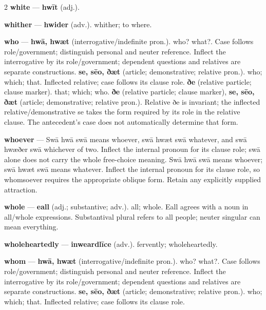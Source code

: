 \begin{multicols}{2}
\textbf{white} — \textbf{hwīt} (adj.).\par
\textbf{whither} — \textbf{hwider} (adv.). whither; to where.\par
\textbf{who} — \textbf{hwā, hwæt} (interrogative/indefinite pron.). who? what?. Case follows role/government; distinguish personal and neuter reference. Inflect the interrogative by its role/government; dependent questions and relatives are separate constructions. \textbf{se, sēo, ðæt} (article; demonstrative; relative pron.). who; which; that. Inflected relative; case follows its clause role. \textbf{ðe} (relative particle; clause marker). that; which; who. \textbf{ðe} (relative particle; clause marker), \textbf{se, sēo, ðæt} (article; demonstrative; relative pron.). Relative ðe is invariant; the inflected relative/demonstrative se takes the form required by its role in the relative clause. The antecedent’s case does not automatically determine that form.\par
\textbf{whoever} — Swā hwā swā means whoever, swā hwæt swā whatever, and swā hwæðer swā whichever of two. Inflect the internal pronoun for its clause role; swā alone does not carry the whole free-choice meaning. Swā hwā swā means whoever; swā hwæt swā means whatever. Inflect the internal pronoun for its clause role, so whomsoever requires the appropriate oblique form. Retain any explicitly supplied attraction.\par
\textbf{whole} — \textbf{eall} (adj.; substantive; adv.). all; whole. Eall agrees with a noun in all/whole expressions. Substantival plural refers to all people; neuter singular can mean everything.\par
\textbf{wholeheartedly} — \textbf{inweardlīce} (adv.). fervently; wholeheartedly.\par
\textbf{whom} — \textbf{hwā, hwæt} (interrogative/indefinite pron.). who? what?. Case follows role/government; distinguish personal and neuter reference. Inflect the interrogative by its role/government; dependent questions and relatives are separate constructions. \textbf{se, sēo, ðæt} (article; demonstrative; relative pron.). who; which; that. Inflected relative; case follows its clause role.\par

\end{multicols}
